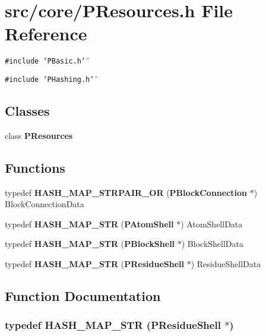 \section{src/core/PResources.h File Reference}
\label{PResources_8h}


{\tt \#include \char`\"{}PBasic.h\char`\"{}}\par
{\tt \#include \char`\"{}PHashing.h\char`\"{}}\par
\subsection*{Classes}
\begin{CompactItemize}
\item 
class {\bf PResources}
\end{CompactItemize}
\subsection*{Functions}
\begin{CompactItemize}
\item 
typedef {\bf HASH\_\-MAP\_\-STRPAIR\_\-OR} ({\bf PBlock\-Connection} $\ast$) Block\-Connection\-Data
\item 
typedef {\bf HASH\_\-MAP\_\-STR} ({\bf PAtom\-Shell} $\ast$) Atom\-Shell\-Data
\item 
typedef {\bf HASH\_\-MAP\_\-STR} ({\bf PBlock\-Shell} $\ast$) Block\-Shell\-Data
\item 
typedef {\bf HASH\_\-MAP\_\-STR} ({\bf PResidue\-Shell} $\ast$) Residue\-Shell\-Data
\end{CompactItemize}


\subsection{Function Documentation}
\subsubsection{\setlength{\rightskip}{0pt plus 5cm}typedef HASH\_\-MAP\_\-STR ({\bf PResidue\-Shell} $\ast$)}\label{PResources_8h_85726e71c8f156f054282674cfd0ce03}


